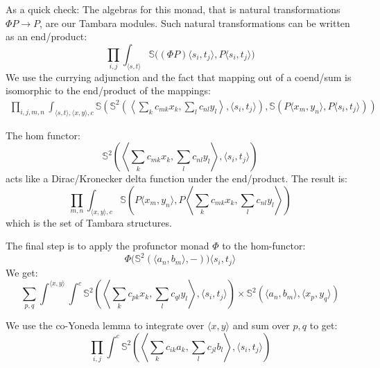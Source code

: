 \documentclass[11pt]{amsart}
\begin{document}
As a quick check: The algebras for this monad, that is natural transformations $\Phi P \to P$, are our Tambara modules. Such natural transformations can be written as an end/product:
\[ \prod_{i, j} \int_{\langle s, t\rangle} \mathbb{S} \big((\Phi P) \langle s_i, t_j \rangle, P \langle s_i, t_j \rangle \big) \]
We use the currying adjunction and the fact that mapping out of a coend/sum is isomorphic to the end/product of the mappings:
 \begin{align*}
\prod_{i, j, m, n} \int_{\langle s, t\rangle, \langle x, y \rangle, c}  \mathbb{S} \left(
    \mathbb{S}^2
      \left(\left \langle \sum_k c_{m k}  x_k
    , \sum_l c_{n l} y_l \right \rangle,  
        \langle s_i, t_j \rangle \right),
     \mathbb{S}(  P\langle x_m, y_n \rangle, P \langle s_i, t_j \rangle ) \right)
\end{align*}

The hom functor:
\[ \mathbb{S}^2  \left(\left \langle 
      \sum_k c_{m k}  x_k
    , \sum_l c_{n l} y_l \right \rangle,  
        \langle s_i, t_j \rangle \right) \]
acts like a Dirac/Kronecker delta function under the end/product. The result is:
\[ \prod_{m, n} \int_{\langle x, y \rangle , c} \mathbb{S} \left(P\langle x_m, y_n \rangle, P \left \langle \sum_k c_{m k}  x_k  , \sum_l c_{n l} y_l \right \rangle \right) \]
which is the set of Tambara structures.

The final step is to apply the profunctor monad $\Phi$ to the hom-functor:
\[ \Phi \big( \mathbb{S}^2(\langle a_n, b_m \rangle, -) \big)  \langle s_i, t_j \rangle \]
We get:
\[ \sum_{p, q} \int^{\langle x, y \rangle} \int^{c}  
    \mathbb{S}^2
      \left(\left \langle \sum_k c_{p k}  x_k
    , \sum_l c_{q l} y_l \right \rangle,  
        \langle s_i, t_j \rangle \right)
     \times  \mathbb{S}^2( \langle a_n, b_m \rangle, \langle x_p, y_q \rangle)\]

We use the co-Yoneda lemma to integrate over $\langle x, y \rangle$ and sum over $p, q$ to get:
\[ \prod_{i, j} \int^c \mathbb{S}^2  \left(\left \langle 
      \sum_k c_{i k}  a_k
    , \sum_l c_{j l} b_l \right \rangle,  
        \langle s_i, t_j \rangle \right) \]
\end{document}
